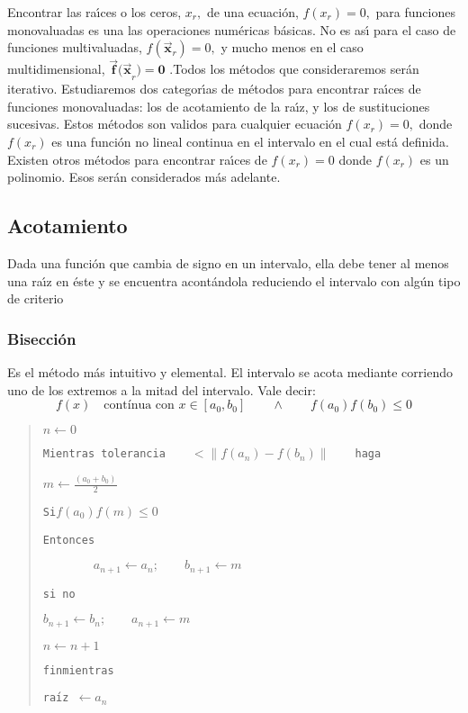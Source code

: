 \documentclass[spanish,titlepage,11pt]{article}
\begin{document}
Encontrar las ra\'{\i}ces o los ceros, $x_{r},$ de una ecuaci\'{o}n,
$f(x_{r})=0,$ para funciones monovaluadas es una las operaciones num\'{e}ricas
b\'{a}sicas. No es as\'{\i} para el caso de funciones multivaluadas,
$f(\mathbf{\vec{x}}_{r})=0,$ y mucho menos en el caso multidimensional,
$\mathbf{\vec{f}(\vec{x}}_{r}\mathbf{)=0}$ .Todos los m\'{e}todos que
consideraremos ser\'{a}n iterativo. Estudiaremos dos categor\'{\i}as de
m\'{e}todos para encontrar ra\'{\i}ces de funciones monovaluadas: los de
acotamiento de la ra\'{\i}z, y los de sustituciones sucesivas. Estos
m\'{e}todos son validos para cualquier ecuaci\'{o}n $f(x_{r})=0,$ donde
$f(x_{r})$ es una funci\'{o}n no lineal continua en el intervalo en el cual
est\'{a} definida. Existen otros m\'{e}todos para encontrar ra\'{\i}ces de
$f(x_{r})=0$ donde $f(x_{r})$ es un polinomio. Esos ser\'{a}n considerados
m\'{a}s adelante.

\subsection{Acotamiento}

Dada una funci\'{o}n que cambia de signo en un intervalo, ella debe tener al
menos una ra\'{\i}z en \'{e}ste y se encuentra acont\'{a}ndola reduciendo el
intervalo con alg\'{u}n tipo de criterio

\subsubsection{Bisecci\'{o}n}

Es el m\'{e}todo m\'{a}s intuitivo y elemental. El intervalo se acota mediante
corriendo uno de los extremos a la mitad del intervalo. Vale decir:
\[
f(x)\quad\text{cont\'{i}nua con }x\in\left[  a_{0},b_{0}\right]  \qquad
\wedge\qquad f(a_{0})f(b_{0})\leqslant0
\]

\begin{quotation}
$n\leftarrow0$

\texttt{Mientras tolerancia}$\qquad<\left\|  f(a_{n})-f(b_{n})\right\|
\qquad$\texttt{haga}

\texttt{\qquad}$m\leftarrow\frac{(a_{0}+b_{0})}{2}$

\texttt{\qquad Si\qquad}$f(a_{0})f(m)\leqslant0$

\texttt{\qquad Entonces}

$\qquad\qquad a_{n+1}\leftarrow a_{n};\qquad b_{n+1}\leftarrow m$

\texttt{\qquad si no}

\texttt{\qquad\qquad}$b_{n+1}\leftarrow b_{n};\qquad a_{n+1}\leftarrow m$

\qquad$n\leftarrow n+1$

\texttt{finmientras}

\texttt{ra\'{\i}z\ }$\leftarrow a_{n}$
\end{quotation}
\end{document}

